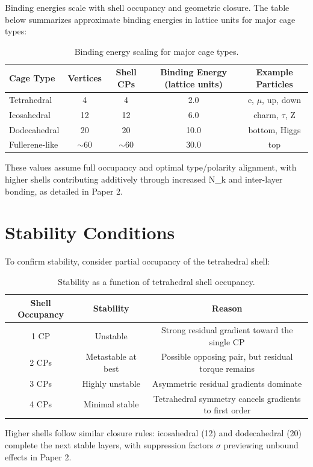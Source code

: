 \documentclass[11pt]{article}
\begin{document}
Binding energies scale with shell occupancy and geometric closure. The table below summarizes approximate binding energies in lattice units for major cage types:

\begin{table}[h]
\centering
\begin{tabular}{lcccc}
\toprule
Cage Type & Vertices & Shell CPs & Binding Energy (lattice units) & Example Particles \\
\midrule
Tetrahedral & 4 & 4 & 2.0 & e, $\mu$, up, down \\
Icosahedral & 12 & 12 & 6.0 & charm, $\tau$, Z \\
Dodecahedral & 20 & 20 & 10.0 & bottom, Higgs \\
Fullerene-like & $\sim$60 & $\sim$60 & 30.0 & top \\
\bottomrule
\end{tabular}
\caption{Binding energy scaling for major cage types.}
\label{tab:cage_binding}
\end{table}

These values assume full occupancy and optimal type/polarity alignment, with higher shells contributing additively through increased N_k and inter-layer bonding, as detailed in Paper 2.

\section{Stability Conditions}

To confirm stability, consider partial occupancy of the tetrahedral shell:

\begin{table}[h]
\centering
\begin{tabular}{ccc}
\toprule
Shell Occupancy & Stability & Reason \\
\midrule
1 CP & Unstable & Strong residual gradient toward the single CP \\
2 CPs & Metastable at best & Possible opposing pair, but residual torque remains \\
3 CPs & Highly unstable & Asymmetric residual gradients dominate \\
4 CPs & Minimal stable & Tetrahedral symmetry cancels gradients to first order \\
\bottomrule
\end{tabular}
\caption{Stability as a function of tetrahedral shell occupancy.}
\label{tab:stability}
\end{table}

Higher shells follow similar closure rules: icosahedral (12) and dodecahedral (20) complete the next stable layers, with suppression factors $\sigma$ previewing unbound effects in Paper 2.
\end{document}
